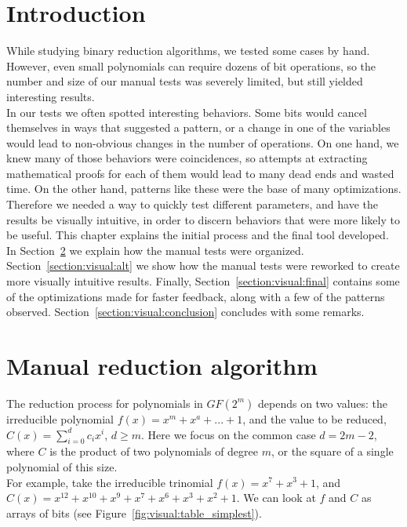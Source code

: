 \section{Introduction}

While studying binary reduction algorithms, we tested some cases by hand. However, even small polynomials can require dozens of bit operations, so the number and size of our manual tests was severely limited, but still yielded interesting results. \\

In our tests we often spotted interesting behaviors. Some bits would cancel themselves in ways that suggested a pattern, or a change in one of the variables would lead to non-obvious changes in the number of operations. On one hand, we knew many of those behaviors were coincidences, so attempts at extracting mathematical proofs for each of them would lead to many dead ends and wasted time. On the other hand, patterns like these were the base of many optimizations. \\

Therefore we needed a way to quickly test different parameters, and have the results be visually intuitive, in order to discern behaviors that were more likely to be useful. This chapter explains the initial process and the final tool developed. In Section~\ref{section:visual:manual} we explain how the manual tests were organized. Section~\ref{section:visual:alt} we show how the manual tests were reworked to create more visually intuitive results. Finally, Section~\ref{section:visual:final} contains some of the optimizations made for faster feedback, along with a few of the patterns observed. Section~\ref{section:visual:conclusion} concludes with some remarks.

\section{Manual reduction algorithm} \label{section:visual:manual}

The reduction process for polynomials in $GF(2^m)$ depends on two values: the irreducible polynomial $f(x) = x^m + x^a + ... + 1$, and the value to be reduced, $C(x) = \sum_{i=0}^{d} c_i x^i$, $d \geq m$. Here we focus on the common case $d=2m-2$, where $C$ is the product of two polynomials of degree $m$, or the square of a single polynomial of this size. \\

For example, take the irreducible trinomial $f(x) = x^7 + x^3 + 1$, and $C(x) = x^{12} + x^{10} + x^9 + x^7 + x^6 + x^3 + x^2 + 1$. We can look at $f$ and $C$ as arrays of bits (see Figure~\ref{fig:visual:table_simplest}). \\

